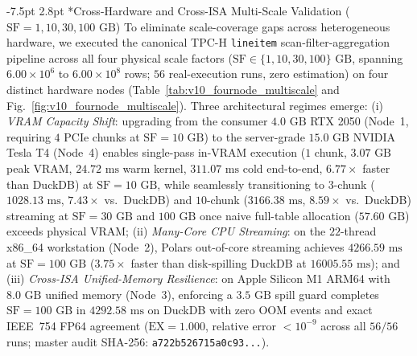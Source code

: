 \documentclass[10pt,a4paper]{article}
\makeatletter
\renewcommand\subsection{\@startsection{subsection}{2}{\z@}%
  {-7.5pt \@plus -2pt \@minus -1pt}%
  {2.8pt \@plus 1pt}%
  {\normalfont\normalsize\bfseries}}
\makeatother
\begin{document}
\vspace{-6pt}

\subsection*{Cross-Hardware and Cross-ISA Multi-Scale Validation ($\text{SF}=1, 10, 30, 100\text{ GB}$)}
To eliminate scale-coverage gaps across heterogeneous hardware, we executed the canonical TPC-H \texttt{lineitem} scan-filter-aggregation pipeline across all four physical scale factors ($\text{SF} \in \{1, 10, 30, 100\}\text{ GB}$, spanning $6.00 \times 10^{6}$ to $6.00 \times 10^{8}$ rows; $56$ real-execution runs, zero estimation) on four distinct hardware nodes (Table~\ref{tab:v10_fournode_multiscale} and Fig.~\ref{fig:v10_fournode_multiscale}). Three architectural regimes emerge: (i) \emph{VRAM Capacity Shift}: upgrading from the consumer $4.0\text{ GB}$ RTX 2050 (Node~1, requiring $4$ PCIe chunks at $\text{SF}=10\text{ GB}$) to the server-grade $15.0\text{ GB}$ NVIDIA Tesla T4 (Node~4) enables single-pass in-VRAM execution ($1$ chunk, $3.07\text{ GB}$ peak VRAM, $24.72\text{ ms}$ warm kernel, $311.07\text{ ms}$ cold end-to-end, $6.77\times$ faster than DuckDB) at $\text{SF}=10\text{ GB}$, while seamlessly transitioning to $3$-chunk ($1028.13\text{ ms}$, $7.43\times$ vs.\ DuckDB) and $10$-chunk ($3166.38\text{ ms}$, $8.59\times$ vs.\ DuckDB) streaming at $\text{SF}=30\text{ GB}$ and $100\text{ GB}$ once naive full-table allocation ($57.60\text{ GB}$) exceeds physical VRAM; (ii) \emph{Many-Core CPU Streaming}: on the $22$-thread x86\_64 workstation (Node~2), Polars out-of-core streaming achieves $4266.59\text{ ms}$ at $\text{SF}=100\text{ GB}$ ($3.75\times$ faster than disk-spilling DuckDB at $16005.55\text{ ms}$); and (iii) \emph{Cross-ISA Unified-Memory Resilience}: on Apple Silicon M1 ARM64 with $8.0\text{ GB}$ unified memory (Node~3), enforcing a $3.5\text{ GB}$ spill guard completes $\text{SF}=100\text{ GB}$ in $4292.58\text{ ms}$ on DuckDB with zero OOM events and exact IEEE~754 FP64 agreement ($\text{EX}=1.000$, relative error $< 10^{-9}$ across all $56/56$ runs; master audit SHA-256: \texttt{a722b526715a0c93...}).
\end{document}
